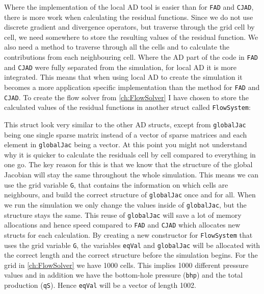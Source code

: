 Where the implementation of the local AD tool is easier than for \texttt{FAD} and \texttt{CJAD}, there is more work when calculating the residual functions. Since we do not use discrete gradient and divergence operators, but traverse through the grid cell by cell, we need somewhere to store the resulting values of the residual function. We also need a method to traverse through all the cells and to calculate the contributions from each neighbouring cell. Where the AD part of the code in \texttt{FAD} and \texttt{CJAD} were fully separated from the simulation, for local AD it is more integrated. This means that when using local AD to create the simulation it becomes a more application specific implementation than the method for \texttt{FAD} and \texttt{CJAD}. To create the flow solver from \autoref{ch:FlowSolver} I have chosen to store the calculated values of the residual functions in another struct called \texttt{FlowSystem}:

This struct look very similar to the other AD structs, except from \texttt{globalJac} being one single sparse matrix instead of a vector of sparse matrices and each element in \texttt{globalJac} being a vector. At this point you might not understand why it is quicker to calculate the residuals cell by cell compared to everything in one go. The key reason for this is that we know that the structure of the global Jacobian will stay the same throughout the whole simulation. This means we can use the grid variable \texttt{G}, that contains the information on which cells are neighbours, and build the correct structure of \texttt{globalJac} once and for all. When we run the simulation we only change the values inside of \texttt{globalJac}, but the structure stays the same. This reuse of \texttt{globalJac} will save a lot of memory allocations and hence speed compared to \texttt{FAD} and \texttt{CJAD} which allocates new structs for each calculation. By creating a new constructor for \texttt{FlowSystem} that uses the grid variable \texttt{G}, the variables \texttt{eqVal} and \texttt{globalJac} will be allocated with the correct length and the correct structure before the simulation begins. For the grid in \autoref{ch:FlowSolver} we have 1000 cells. This implies 1000 different pressure values and in addition we have the bottom-hole pressure (\texttt{bhp}) and the total production (\texttt{qS}). Hence \texttt{eqVal} will be a vector of length 1002.

